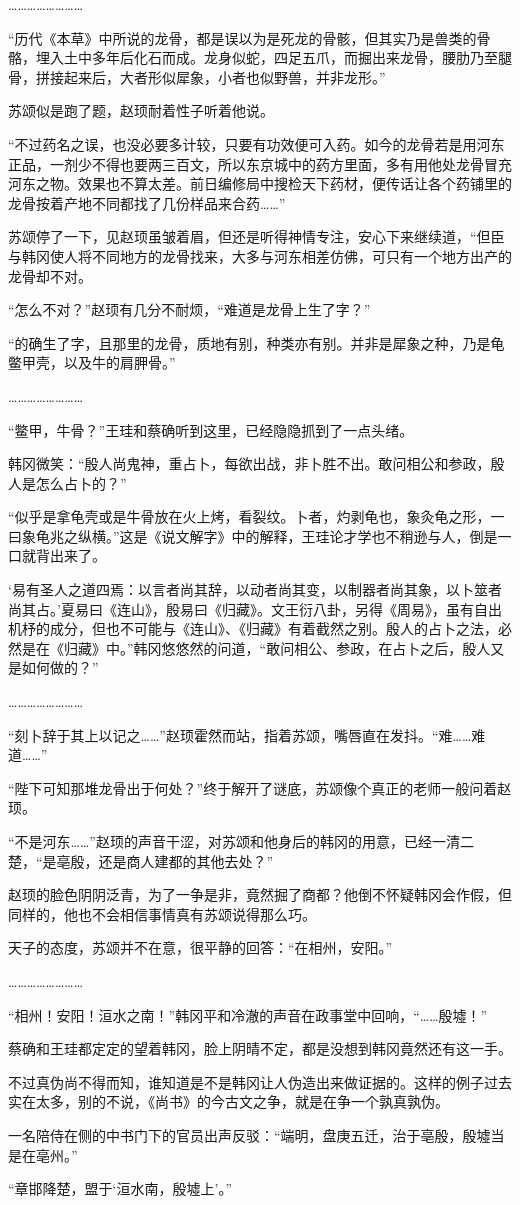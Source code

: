 ……………………

“历代《本草》中所说的龙骨，都是误以为是死龙的骨骸，但其实乃是兽类的骨骼，埋入土中多年后化石而成。龙身似蛇，四足五爪，而掘出来龙骨，腰肋乃至腿骨，拼接起来后，大者形似犀象，小者也似野兽，并非龙形。”

苏颂似是跑了题，赵顼耐着性子听着他说。

“不过药名之误，也没必要多计较，只要有功效便可入药。如今的龙骨若是用河东正品，一剂少不得也要两三百文，所以东京城中的药方里面，多有用他处龙骨冒充河东之物。效果也不算太差。前日编修局中搜检天下药材，便传话让各个药铺里的龙骨按着产地不同都找了几份样品来合药……”

苏颂停了一下，见赵顼虽皱着眉，但还是听得神情专注，安心下来继续道，“但臣与韩冈使人将不同地方的龙骨找来，大多与河东相差仿佛，可只有一个地方出产的龙骨却不对。

“怎么不对？”赵顼有几分不耐烦，“难道是龙骨上生了字？”

“的确生了字，且那里的龙骨，质地有别，种类亦有别。并非是犀象之种，乃是龟鳖甲壳，以及牛的肩胛骨。”

……………………

“鳖甲，牛骨？”王珪和蔡确听到这里，已经隐隐抓到了一点头绪。

韩冈微笑：“殷人尚鬼神，重占卜，每欲出战，非卜胜不出。敢问相公和参政，殷人是怎么占卜的？”

“似乎是拿龟壳或是牛骨放在火上烤，看裂纹。卜者，灼剥龟也，象灸龟之形，一曰象龟兆之纵横。”这是《说文解字》中的解释，王珪论才学也不稍逊与人，倒是一口就背出来了。

‘易有圣人之道四焉：以言者尚其辞，以动者尚其变，以制器者尚其象，以卜筮者尚其占。’夏易曰《连山》，殷易曰《归藏》。文王衍八卦，另得《周易》，虽有自出机杼的成分，但也不可能与《连山》、《归藏》有着截然之别。殷人的占卜之法，必然是在《归藏》中。”韩冈悠悠然的问道，“敢问相公、参政，在占卜之后，殷人又是如何做的？”

……………………

“刻卜辞于其上以记之……”赵顼霍然而站，指着苏颂，嘴唇直在发抖。“难……难道……”

“陛下可知那堆龙骨出于何处？”终于解开了谜底，苏颂像个真正的老师一般问着赵顼。

“不是河东……”赵顼的声音干涩，对苏颂和他身后的韩冈的用意，已经一清二楚，“是亳殷，还是商人建都的其他去处？”

赵顼的脸色阴阴泛青，为了一争是非，竟然掘了商都？他倒不怀疑韩冈会作假，但同样的，他也不会相信事情真有苏颂说得那么巧。

天子的态度，苏颂并不在意，很平静的回答：“在相州，安阳。”

……………………

“相州！安阳！洹水之南！”韩冈平和冷澈的声音在政事堂中回响，“……殷墟！”

蔡确和王珪都定定的望着韩冈，脸上阴晴不定，都是没想到韩冈竟然还有这一手。

不过真伪尚不得而知，谁知道是不是韩冈让人伪造出来做证据的。这样的例子过去实在太多，别的不说，《尚书》的今古文之争，就是在争一个孰真孰伪。

一名陪侍在侧的中书门下的官员出声反驳：“端明，盘庚五迁，治于亳殷，殷墟当是在亳州。”

“章邯降楚，盟于‘洹水南，殷墟上’。”

